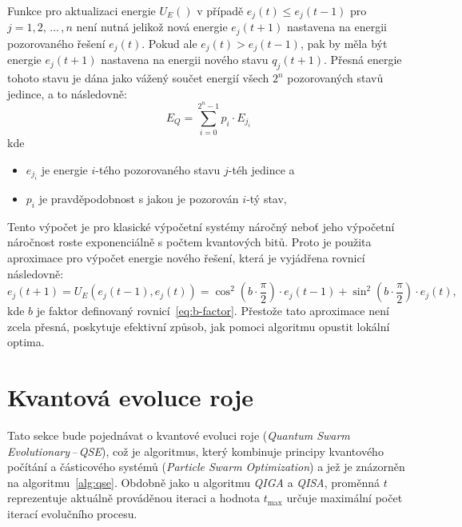 Funkce pro aktualizaci energie $U_E\left(\right)$ v případě $e_j\left(t\right) \leq e_j\left(t-1\right)$ pro $j = 1,2,\,\dots\,,n$ není nutná jelikož nová energie $e_j\left(t+1\right)$ nastavena na energii pozorovaného řešení $e_j\left(t\right)$. 
Pokud ale $e_j\left(t\right) > e_j\left(t-1\right)$, pak by měla být energie $e_j\left(t+1\right)$ nastavena na energii nového stavu $q_j\left(t+1\right)$. 
Přesná energie tohoto stavu je dána jako vážený součet energií všech $2^n$ pozorovaných stavů jedince, a to následovně:
\begin{equation*}
    E_Q = \sum_{i=0}^{2^n-1} p_i \cdot E_{j_i}
\end{equation*}
kde 
\begin{itemize}
    \item $e_{j_i}$ je energie $i$-tého pozorovaného stavu $j$-téh jedince a
    \item $p_i$ je pravděpodobnost s jakou je pozorován $i$-tý stav,
\end{itemize}
Tento výpočet je pro klasické výpočetní systémy náročný neboť jeho výpočetní náročnost roste exponenciálně s počtem kvantových bitů. 
Proto je použita aproximace pro výpočet energie nového řešení, která je vyjádřena rovnicí následovně:
\begin{equation*}
    e_j\left(t+1\right) = U_E\left(e_j\left(t-1\right), e_j\left(t\right)\right) = \cos^2{\left(b \cdot \frac{\pi}{2}\right)} \cdot e_j\left(t-1\right) + \sin^2{\left(b \cdot \frac{\pi}{2}\right)} \cdot e_j\left(t\right),
\end{equation*}
kde $b$ je faktor definovaný rovnicí~\ref{eq:b-factor}. Přestože tato aproximace není zcela přesná, poskytuje efektivní způsob, jak pomoci algoritmu opustit lokální optima. 

\section{Kvantová evoluce roje}\label{sec:qse}
Tato sekce bude pojednávat o kvantové evoluci roje (\emph{Quantum Swarm Evolutionary\,--\,QSE}), což je algoritmus, který kombinuje principy kvantového počítání a částicového systémů (\emph{Particle Swarm Optimization}) a jež je znázorněn na algoritmu~\ref{alg:qse}. 
Obdobně jako u algoritmu \emph{QIGA} a \emph{QISA}, proměnná $t$ reprezentuje aktuálně prováděnou iteraci a hodnota $t_{\text{max}}$ určuje maximální počet iterací evolučního procesu.

